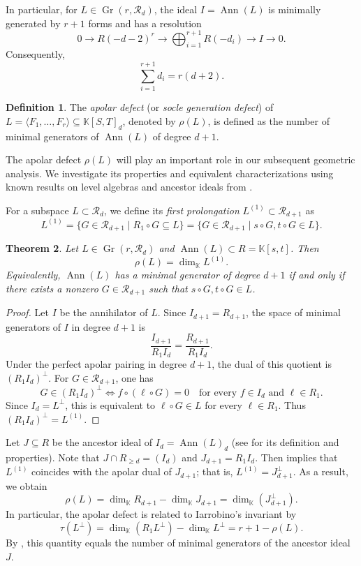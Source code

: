 \documentclass[a4paper, 11pt]{amsart}
\newtheorem{theorem}{Theorem}
\numberwithin{theorem}{section}
\theoremstyle{definition}
\newtheorem{definition}[theorem]{Definition}
\numberwithin{equation}{section}
\DeclareMathOperator{\Ann}{\operatorname{Ann}}
\begin{document}
In particular, for $L\in\operatorname{Gr}(r,\mathcal{R}_d)$, the ideal $I=\Ann(L)$ is minimally generated by $r+1$ forms and has a resolution
\[
0\longrightarrow R(-d-2)^r
\longrightarrow \bigoplus_{i=1}^{r+1}R(-d_i)
\longrightarrow I\longrightarrow 0.
\]
Consequently,
\begin{equation}\label{equ:totalDegree}
    \sum_{i=1}^{r+1}d_i=r(d+2).
\end{equation}
\begin{definition}
The \emph{apolar defect} (or \emph{socle generation defect}) of $L = \langle F_1, \dots, F_r \rangle \subseteq \mathbb{K}[S,T]_d$, denoted by $\rho(L)$, is defined as the number of minimal generators of $\Ann(L)$ of degree $d+1$.
\end{definition}
The apolar defect $\rho(L)$ will play an important role in our subsequent geometric analysis. 
We investigate its properties and equivalent characterizations using known results on level algebras and ancestor ideals from \cite{MR2028071}.

For a subspace $L \subset \mathcal{R}_d$, we define its \emph{first prolongation} $L^{(1)} \subset \mathcal{R}_{d+1}$ as
\[
L^{(1)} = \{G \in \mathcal{R}_{d+1} \mid R_1 \circ G \subseteq L\} = \{G \in \mathcal{R}_{d+1} \mid s \circ G, t \circ G \in L\}.
\]
\begin{theorem}\label{thm:inverse_space_top_generators}
Let $L\in\operatorname{Gr}(r,\mathcal{R}_d)$ and $\Ann(L)\subset R = \mathbb{K}[s,t]$. 
Then
\[
\rho(L)=\dim_{\mathbb{K}}L^{(1)}.
\]
Equivalently, $\Ann(L)$ has a minimal generator of degree $d+1$ if and only if there exists a nonzero $G\in\mathcal{R}_{d+1}$ such that $s\circ G,t\circ G\in L$.
\end{theorem}
\begin{proof}
Let $I$ be the annihilator of $L$.
Since $I_{d+1}=R_{d+1}$, the space of minimal generators of $I$ in degree $d+1$ is
\[
\frac{I_{d+1}}{R_1I_d}=\frac{R_{d+1}}{R_1I_d}.
\]
Under the perfect apolar pairing in degree $d+1$, the dual of this quotient is $(R_1I_d)^\perp$.  
For $G\in\mathcal{R}_{d+1}$, one has
\[
G\in(R_1I_d)^\perp
\iff f\circ(\ell\circ G)=0
\quad\text{for every }f\in I_d\text{ and }\ell\in R_1.
\]
Since $I_d=L^\perp$, this is equivalent to $\ell\circ G\in L$ for every $\ell\in R_1$.  Thus $(R_1I_d)^\perp=L^{(1)}$.
\end{proof}
Let $J \subseteq R$ be the ancestor ideal of $I_d = \Ann(L)_d$ (see \cite{MR2028071} for its definition and properties).
Note that $J\cap R_{\geq d} = (I_d)$ and $J_{d+1}=R_1I_d$.
Then  implies that $L^{(1)}$ coincides with the apolar dual of $J_{d+1}$; that is, $L^{(1)} = J_{d+1}^\perp$.
As a result, we obtain
\[
\rho(L) = \dim_{\mathbb{K}} R_{d+1} - \dim_{\mathbb{K}}J_{d+1} = \dim_{\mathbb{K}}(J_{d+1}^\perp).
\]
In particular, the apolar defect is related to Iarrobino's invariant by
\[
\tau(L^\perp) = \dim_{\mathbb K}(R_1L^\perp)-\dim_{\mathbb K}L^\perp = r+1-\rho(L).
\]
By \cite[Lemma 2.2]{MR2028071}, this quantity equals the number of minimal generators of the ancestor ideal $J$.
\end{document}
